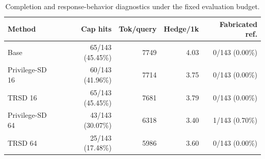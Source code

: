 \begin{table}[t]
\centering
\small
\caption{Completion and response-behavior diagnostics under the fixed evaluation budget.}
\label{tab:trsd-completion-behavior}
\begin{tabular}{lrrrr}
\toprule
Method & Cap hits & Tok/query & Hedge/1k & Fabricated ref. \\
\midrule
Base & 65/143 (45.45\%) & 7749 & 4.03 & 0/143 (0.00\%) \\
Privilege-SD 16 & 60/143 (41.96\%) & 7714 & 3.75 & 0/143 (0.00\%) \\
TRSD 16 & 65/143 (45.45\%) & 7681 & 3.79 & 0/143 (0.00\%) \\
Privilege-SD 64 & 43/143 (30.07\%) & 6318 & 3.40 & 1/143 (0.70\%) \\
TRSD 64 & 25/143 (17.48\%) & 5986 & 3.60 & 0/143 (0.00\%) \\
\bottomrule
\end{tabular}
\end{table}
